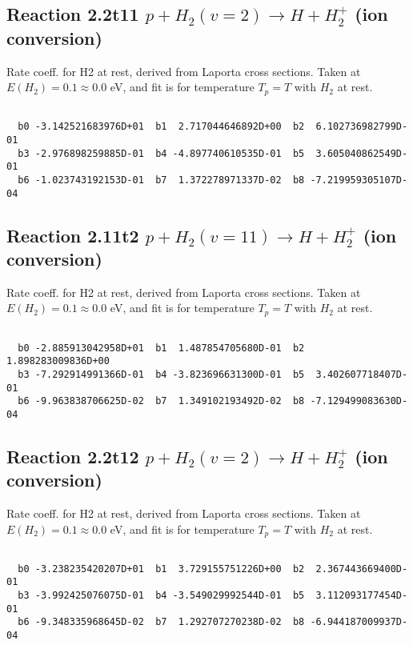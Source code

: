 \documentclass[12pt,dvipdfmx]{article}
\begin{document}
\newpage
\subsection{
Reaction 2.2t11
$ p + H_2(v=2) \rightarrow H + H_2^+$ (ion conversion)
}
Rate coeff. for H2 at rest, derived from Laporta cross sections.
Taken at $E(H_2) = 0.1 \approx 0.0$ eV,  and fit is for temperature $T_p=T$ with $H_2$ at rest.

\begin{small}\begin{verbatim}

  b0 -3.142521683976D+01  b1  2.717044646892D+00  b2  6.102736982799D-01
  b3 -2.976898259885D-01  b4 -4.897740610535D-01  b5  3.605040862549D-01
  b6 -1.023743192153D-01  b7  1.372278971337D-02  b8 -7.219959305107D-04

\end{verbatim}\end{small}

\newpage
\subsection{
Reaction 2.11t2
$ p + H_2(v=11) \rightarrow H + H_2^+$ (ion conversion)
}
Rate coeff. for H2 at rest, derived from Laporta cross sections.
Taken at $E(H_2) = 0.1 \approx 0.0$ eV,  and fit is for temperature $T_p=T$ with $H_2$ at rest.

\begin{small}\begin{verbatim}

  b0 -2.885913042958D+01  b1  1.487854705680D-01  b2  1.898283009836D+00
  b3 -7.292914991366D-01  b4 -3.823696631300D-01  b5  3.402607718407D-01
  b6 -9.963838706625D-02  b7  1.349102193492D-02  b8 -7.129499083630D-04

\end{verbatim}\end{small}

\newpage
\subsection{
Reaction 2.2t12
$ p + H_2(v=2) \rightarrow H + H_2^+$ (ion conversion)
}
Rate coeff. for H2 at rest, derived from Laporta cross sections.
Taken at $E(H_2) = 0.1 \approx 0.0$ eV,  and fit is for temperature $T_p=T$ with $H_2$ at rest.

\begin{small}\begin{verbatim}

  b0 -3.238235420207D+01  b1  3.729155751226D+00  b2  2.367443669400D-01
  b3 -3.992425076075D-01  b4 -3.549029992544D-01  b5  3.112093177454D-01
  b6 -9.348335968645D-02  b7  1.292707270238D-02  b8 -6.944187009937D-04

\end{verbatim}\end{small}
\end{document}
